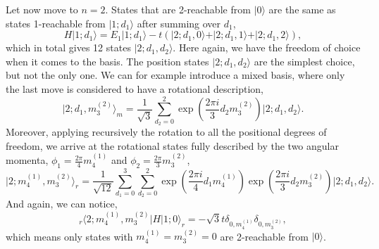 \documentclass[11pt, a4paper, onecolumn]{article}
\newcommand{\ket}[1]{\vert #1 \rangle}
\newcommand{\bra}[1]{\langle #1 \vert}
\begin{document}
Let now move to $n=2$. States that are 2-reachable from $\ket{0}$ are the same as states 1-reachable from $\ket{1;d_1}$ after summing over $d_1$,
\begin{equation}
	H\ket{1;d_1} = E_1 \ket{1;d_1} - t(\ket{2;d_1,0}+\ket{2;d_1,1}+\ket{2;d_1,2}),
\end{equation}
which in total gives 12 states $\ket{2;d_1,d_2}$. Here again, we have the freedom of choice when it comes to the basis. The position states $\ket{2;d_1,d_2}$ are the simplest choice, but not the only one. We can for example introduce a mixed basis, where only the last move is considered to have a rotational description,
\begin{equation}
	\ket{2;d_1,m^{(2)}_3}_m = \frac{1}{\sqrt{3}}\sum_{d_2=0}^2 \exp\left(\frac{2 \pi i}{3}d_2 m^{(2)}_3\right)\ket{2;d_1,d_2}.
\end{equation}
Moreover, applying recursively the rotation to all the positional degrees of freedom, we arrive at the rotational states fully described by the two angular momenta, $\phi_1 = \frac{2\pi}{4}m^{(1)}_4$ and $\phi_2 = \frac{2\pi}{3}m^{(2)}_3$,
\begin{equation}
	\ket{2;m^{(1)}_4,m^{(2)}_3}_r = \frac{1}{\sqrt{12}}\sum_{d_1=0}^3 \sum_{d_2=0}^2 \exp\left(\frac{2 \pi i}{4}d_1 m^{(1)}_4\right) \exp\left(\frac{2 \pi i}{3}d_2 m^{(2)}_3\right)\ket{2;d_1,d_2}.
\end{equation}
And again, we can notice,
\begin{equation}
	_r\bra{2;m^{(1)}_4,m^{(2)}_3}H\ket{1;0}_r = -\sqrt{3}t \delta_{0,m^{(1)}_4} \delta_{0,m^{(2)}_3},
\end{equation}
which means only states with $m^{(1)}_4 = m^{(2)}_3 = 0$ are 2-reachable from $\ket{0}$. 
\end{document}
